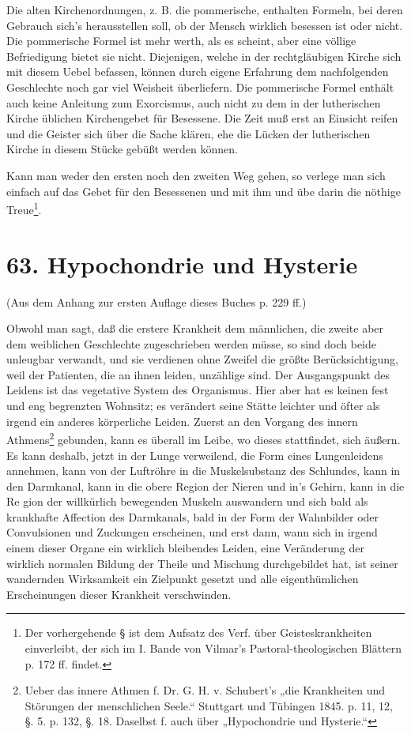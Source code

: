 Die alten Kirchenordnungen, z. B. die pommerische, enthalten Formeln, bei deren Gebrauch sich’s herausstellen soll, ob der Mensch wirklich besessen ist oder nicht. Die pommerische Formel ist mehr werth, als es scheint, aber eine völlige Befriedigung bietet sie nicht. Diejenigen, welche in der rechtgläubigen Kirche sich mit diesem Uebel befassen, können durch eigene Erfahrung dem nachfolgenden Geschlechte noch gar viel Weisheit überliefern. Die pommerische Formel enthält auch keine Anleitung zum Exorcismus, auch nicht zu dem in der lutherischen Kirche üblichen Kirchengebet für Besessene. Die Zeit muß erst an Einsicht reifen und die Geister sich über die Sache klären, ehe die Lücken der lutherischen Kirche in diesem Stücke gebüßt werden können.

Kann man weder den ersten noch den zweiten Weg gehen, so verlege man sich einfach auf das Gebet für den Besessenen und mit ihm und übe darin die nöthige Treue\footnote{Der vorhergehende § ist dem Aufsatz des Verf. über Geisteskrankheiten einverleibt, der sich im I. Bande von Vilmar’s Pastoral-theologischen Blättern p. 172 ff. findet.}.

\section{63. Hypochondrie und Hysterie}

\begin{center}
(Aus dem Anhang zur ersten Auflage dieses Buches p. 229 ff.)
\end{center}

Obwohl man sagt, daß die erstere Krankheit dem männlichen, die zweite aber dem weiblichen Geschlechte zugeschrieben werden müsse, so sind doch beide unleugbar verwandt, und sie verdienen ohne Zweifel die größte Berücksichtigung, weil der Patienten, die an ihnen leiden, unzählige sind. Der Ausgangspunkt des Leidens ist das vegetative System des Organismus. Hier aber hat es keinen fest und eng begrenzten Wohnsitz; es verändert seine Stätte leichter und öfter als irgend ein anderes körperliche Leiden. Zuerst an den Vorgang des innern Athmens\footnote{Ueber das innere Athmen f. Dr. G. H. v. Schubert’s „die Krankheiten und Störungen der menschlichen Seele.“ Stuttgart und Tübingen 1845. p. 11, 12, §. 5. p. 132, §. 18. Daselbst f. auch über „Hypochondrie und Hysterie.“} gebunden, kann es überall im Leibe, wo dieses stattfindet, sich äußern. Es kann deshalb, jetzt in der Lunge verweilend, die Form eines Lungenleidens annehmen, kann von der Luftröhre in die Muskelsubstanz des Schlundes, kann in den Darmkanal, kann in die obere Region der Nieren und in’s Gehirn, kann in die Re%
gion der willkürlich bewegenden Muskeln auswandern und sich bald als krankhafte Affection des Darmkanals, bald in der Form der Wahnbilder oder Convulsionen und Zuckungen erscheinen, und erst dann, wann sich in irgend einem dieser Organe ein wirklich bleibendes Leiden, eine Veränderung der wirklich normalen Bildung der Theile und Mischung durchgebildet hat, ist seiner wandernden Wirksamkeit ein Zielpunkt gesetzt und alle eigenthümlichen Erscheinungen dieser Krankheit verschwinden.

